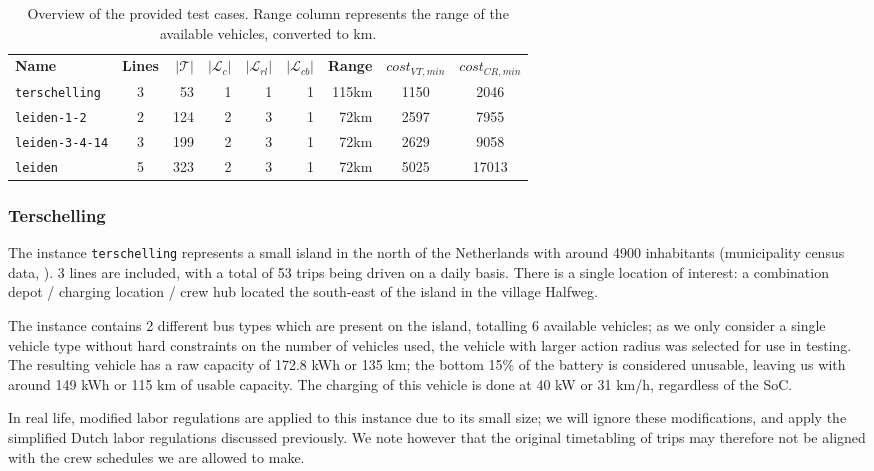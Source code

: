 \documentclass[]{article}
\begin{document}
\begin{table}[h]
  \centering
  \begin{tabular}{lcrrrrrcc}
    \toprule
       \textbf{Name} & \textbf{Lines} & $|\mathcal{T}|$ & $|\mathcal{L}_c|$ & $|\mathcal{L}_{rl}|$ & $|\mathcal{L}_{cb}|$ & \textbf{Range} & $cost_{VT,min}$ & $cost_{CR,min}$ \\
        \cmidrule(lr){1-1}\cmidrule(lr){2-6} \cmidrule(lr){7-7} \cmidrule(lr){8-9}
        \texttt{terschelling}   & 3 & 53 & 1 & 1 & 1 & 115km & 1150 & 2046 \\
        \texttt{leiden-1-2}  & 2 & 124 & 2 & 3 & 1 & 72km & 2597 & 7955 \\
        \texttt{leiden-3-4-14}  & 3 & 199 & 2 & 3 & 1 & 72km & 2629 & 9058 \\
        \texttt{leiden}  & 5 & 323 & 2 & 3 & 1 & 72km & 5025 & 17013 \\
        \bottomrule
  \end{tabular}
  \caption{Overview of the provided test cases. Range column represents the range of the available vehicles, converted to km.}
  \label{tab:instances}
\end{table}

\subsubsection{Terschelling}
The instance \texttt{terschelling} represents a small island in the north of the Netherlands with around 4900 inhabitants (municipality census data, \citet{Terschelling2025}). 3 lines are included, with a total of 53 trips being driven on a daily basis. There is a single location of interest: a combination depot / charging location / crew hub located the south-east of the island in the village Halfweg. 

The instance contains 2 different bus types which are present on the island, totalling 6 available vehicles; as we only consider a single vehicle type without hard constraints on the number of vehicles used, the vehicle with larger action radius was selected for use in testing. The resulting vehicle has a raw capacity of 172.8 kWh or 135 km; the bottom 15\% of the battery is considered unusable, leaving us with around 149 kWh or 115 km of usable capacity. The charging of this vehicle is done at 40 kW or 31 km/h, regardless of the SoC.

In real life, modified labor regulations are applied to this instance due to its small size; we will ignore these modifications, and apply the simplified Dutch labor regulations discussed previously. We note however that the original timetabling of trips may therefore not be aligned with the crew schedules we are allowed to make.
\end{document}
